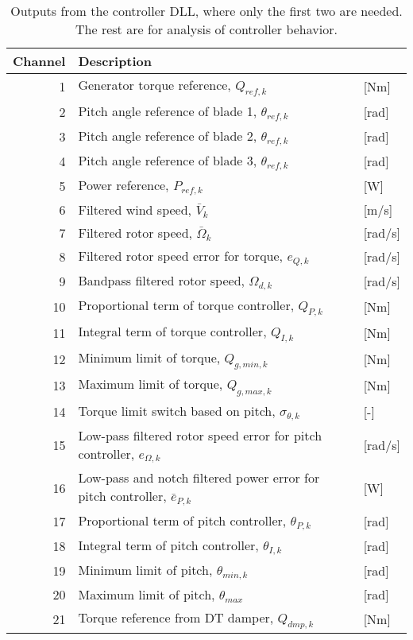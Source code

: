 \begin{table}[b]
\center
\begin{tabular}{r|ll}
Channel & Description \\ \hline
 1& Generator torque reference, $Q_{ref,k}$            &[Nm]\\
 2& Pitch angle reference of blade 1, $\theta_{ref,k}$      &[rad]\\
 3& Pitch angle reference of blade 2, $\theta_{ref,k}$      &[rad]\\
 4& Pitch angle reference of blade 3, $\theta_{ref,k}$      &[rad]\\
 5& Power reference, $P_{ref,k}$                       &[W]\\
 6& Filtered wind speed, $\bar V_k$                   &[m/s]\\
 7& Filtered rotor speed, $\bar \Omega_k$                  &[rad/s]\\
 8& Filtered rotor speed error for torque, $e_{Q,k}$ &[rad/s]\\
 9& Bandpass filtered rotor speed, $\Omega_{d,k}$         &[rad/s]\\
10& Proportional term of torque controller, $Q_{P,k}$    &[Nm]\\
11& Integral term of torque controller, $Q_{I,k}$    &[Nm]\\
12& Minimum limit of torque, $Q_{g,min,k}$               &[Nm]\\
13& Maximum limit of torque, $Q_{g,max,k}$               &[Nm]\\
14& Torque limit switch based on pitch, $\sigma_{\theta,k}$    &[-]\\
15& Low-pass filtered rotor speed error for pitch controller, $e_{\Omega,k}$  &[rad/s]\\
16& Low-pass and notch filtered power error for pitch controller, $\bar e_{P,k}$                 &[W]\\
17& Proportional term of pitch controller, $\theta_{P,k}$ &[rad]\\
18& Integral term of pitch controller, $\theta_{I,k}$     &[rad]\\
19& Minimum limit of pitch, $\theta_{min,k}$                &[rad]\\
20& Maximum limit of pitch, $\theta_{max}$                &[rad]\\
21& Torque reference from DT damper, $Q_{dmp,k}$       &[Nm]
\end{tabular}
\caption{Outputs from the controller DLL, where only the first two are needed. The rest are for analysis of controller behavior.  \label{t:output}}
\end{table}

